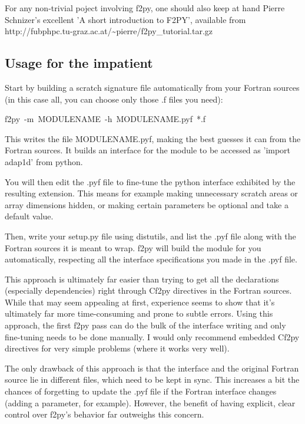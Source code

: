 For any non-trivial poject involving f2py, one should also keep at
hand Pierre Schnizer's excellent 'A short introduction to F2PY', available
from http://fubphpc.tu-graz.ac.at/\textasciitilde{}pierre/f2py\_tutorial.tar.gz 


\subsection{Usage for the impatient }

Start by building a scratch signature file automatically from your
Fortran sources (in this case all, you can choose only those .f files
you need): 

\begin{lyxcode}
f2py~-m~MODULENAME~-h~MODULENAME.pyf~{*}.f~
\end{lyxcode}
This writes the file MODULENAME.pyf, making the best guesses it can
from the Fortran sources. It builds an interface for the module to
be accessed as 'import adap1d' from python.

You will then edit the .pyf file to fine-tune the python interface
exhibited by the resulting extension. This means for example making
unnecessary scratch areas or array dimensions hidden, or making certain
parameters be optional and take a default value.

Then, write your setup.py file using distutils, and list the .pyf
file along with the Fortran sources it is meant to wrap. f2py will
build the module for you automatically, respecting all the interface
specifications you made in the .pyf file.

This approach is ultimately far easier than trying to get all the
declarations (especially dependencies) right through Cf2py directives
in the Fortran sources. While that may seem appealing at first, experience
seems to show that it's ultimately far more time-consuming and prone
to subtle errors. Using this approach, the first f2py pass can do
the bulk of the interface writing and only fine-tuning needs to be
done manually. I would only recommend embedded Cf2py directives for
very simple problems (where it works very well).

The only drawback of this approach is that the interface and the original
Fortran source lie in different files, which need to be kept in sync.
This increases a bit the chances of forgetting to update the .pyf
file if the Fortran interface changes (adding a parameter, for example).
However, the benefit of having explicit, clear control over f2py's
behavior far outweighs this concern. 


